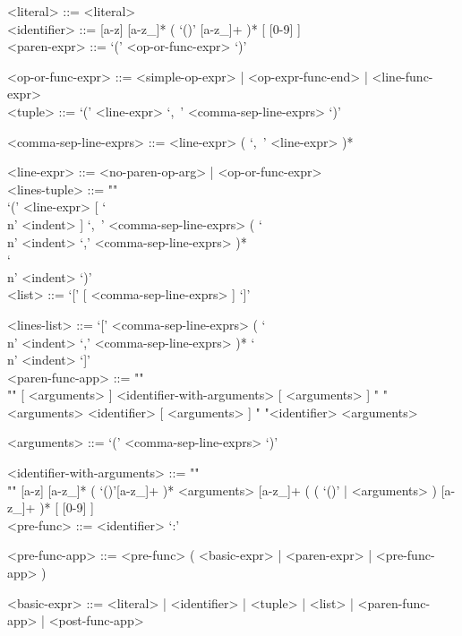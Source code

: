 \documentclass{article}
\begin{document}
\begin{grammar}

<literal> ::= <literal> \\

<identifier> ::= [a-z] [a-z_]* ( `()' [a-z_]+ )* [ [0-9] ] \\

<paren-expr> ::= `(' <op-or-func-expr> `)'  

<op-or-func-expr> ::=
<simple-op-expr> | <op-expr-func-end> | <line-func-expr>  \\

<tuple> ::= `(' <line-expr> `,\ ' <comma-sep-line-exprs> `)'

<comma-sep-line-exprs> ::= <line-expr> ( `,\ ' <line-expr> )*

<line-expr> ::= <no-paren-op-arg> | <op-or-func-expr> \\

<lines-tuple> ::= ""\\
`(' <line-expr> [ `\\n' <indent> ] `,\ ' <comma-sep-line-exprs> 
( `\\n' <indent> `,' <comma-sep-line-exprs> )* \\
`\\n' <indent> `)' \\

<list> ::= `[' [ <comma-sep-line-exprs> ] `]'

<lines-list> ::= 
`[' <comma-sep-line-exprs>
( `\\n' <indent> `,' <comma-sep-line-exprs> )*
`\\n' <indent> `]' \\

<paren-func-app> ::= ""\\""
[ <arguments> ] <identifier-with-arguments> [ <arguments> ]
\alt " "<arguments> <identifier> [ <arguments> ]
\alt " "<identifier> <arguments>

<arguments> ::= `(' <comma-sep-line-exprs> `)'

<identifier-with-arguments> ::= ""\\""
[a-z] [a-z_]* ( `()'[a-z_]+ )* <arguments>
[a-z_]+ ( ( `()' | <arguments> ) [a-z_]+ )* 
[ [0-9] ] \\

<pre-func> ::= <identifier> `:'

<pre-func-app> ::= <pre-func> ( <basic-expr> | <paren-expr> | <pre-func-app> )

<basic-expr> ::=
<literal> | <identifier> | <tuple> | <list> | <paren-func-app> | <post-func-app> \\


\end{grammar}
\end{document}
